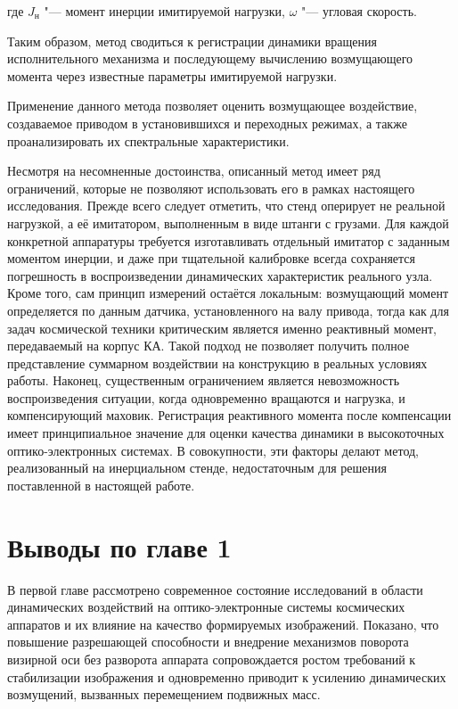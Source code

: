 где \(J_{\text{н}}\) "--- момент инерции имитируемой нагрузки, \(\omega\) "--- угловая скорость.

Таким образом, метод сводиться к регистрации динамики вращения исполнительного механизма и последующему вычислению возмущающего момента через известные параметры имитируемой нагрузки.

Применение данного метода позволяет оценить возмущающее воздействие, создаваемое приводом в установившихся и переходных режимах, а также проанализировать их спектральные характеристики.

Несмотря на несомненные достоинства, описанный метод имеет ряд ограничений, которые не позволяют использовать его в рамках настоящего исследования. Прежде всего следует отметить, что стенд оперирует не реальной нагрузкой, а её имитатором, выполненным в виде штанги с грузами. Для каждой конкретной аппаратуры требуется изготавливать отдельный имитатор с заданным моментом инерции, и даже при тщательной калибровке всегда сохраняется погрешность в воспроизведении динамических характеристик реального узла. Кроме того, сам принцип измерений остаётся локальным: возмущающий момент определяется по данным датчика, установленного на валу привода, тогда как для задач космической техники критическим является именно реактивный момент, передаваемый на корпус КА. Такой подход не позволяет получить полное представление суммарном воздействии на конструкцию в реальных условиях работы. Наконец, существенным ограничением является невозможность воспроизведения ситуации, когда одновременно вращаются и нагрузка, и компенсирующий маховик. Регистрация реактивного момента после компенсации имеет принципиальное значение для оценки качества динамики в высокоточных оптико-электронных системах. В совокупности, эти факторы делают метод, реализованный на инерциальном стенде, недостаточным для решения поставленной в настоящей работе.

\section*{Выводы по главе 1}
В первой главе рассмотрено современное состояние исследований в области динамических воздействий на оптико-электронные системы космических аппаратов и их влияние на качество формируемых изображений. Показано, что повышение разрешающей способности и внедрение механизмов поворота визирной оси без разворота аппарата сопровождается ростом требований к стабилизации изображения и одновременно приводит к усилению динамических возмущений, вызванных перемещением подвижных масс.

